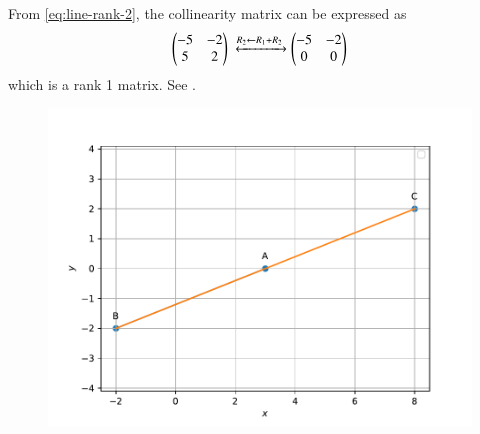 			From \eqref{eq:line-rank-2},
the collinearity matrix can be expressed as
 \begin{align}
			    \myvec{-5 & -2
			    \\
			    5 & 2 }  
			    \xleftrightarrow[]{R_2 \leftarrow {R_1 + R_2}}
			    \myvec{	    -5 & -2  
			    \\
			    0 & 0}  
\end{align}
which is a rank 1 matrix.  See 
		.
	\begin{figure}[!ht]
		\centering
 \includegraphics[width=\columnwidth]{chapters/11/10/2/20/figs/figs6.pdf}
		\caption{}
		\label{fig:11/10/2/20}
  	\end{figure}
